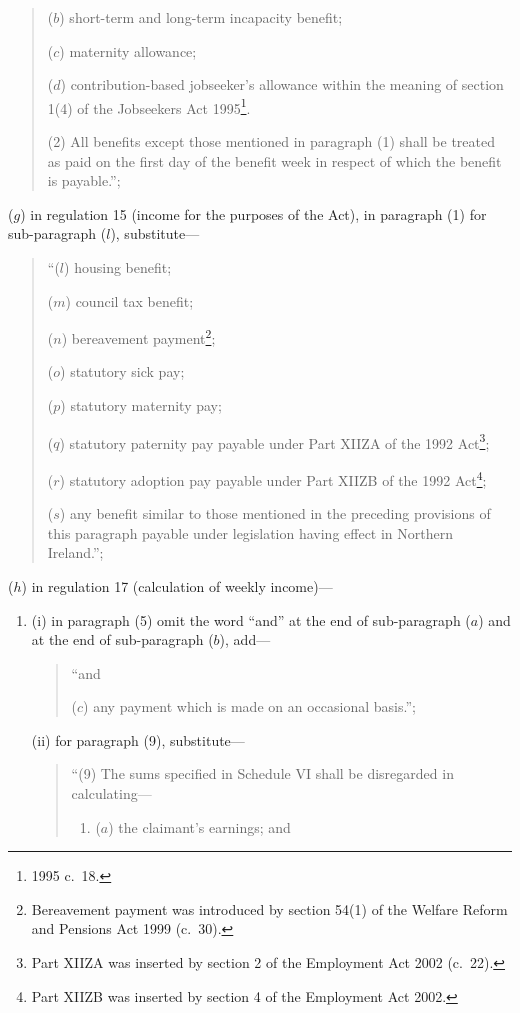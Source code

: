 \documentclass[12pt,a4paper]{article}
\begin{document}
\begin{enumerate}
\begin{quotation}
\begin{enumerate}
($b$) short-term and long-term incapacity benefit;

($c$) maternity allowance;

($d$) contribution-based jobseeker’s allowance within the meaning of section 1(4) of the Jobseekers Act 1995\footnote{1995 c.\ 18.}.
\end{enumerate}

(2) All benefits except those mentioned in paragraph (1) shall be treated as paid on the first day of the benefit week in respect of which the benefit is payable.”;
\end{quotation}

($g$) in regulation 15 (income for the purposes of the Act), in paragraph (1) for sub-paragraph ($l$), substitute—
\begin{quotation}
“($l$) housing benefit;

($m$) council tax benefit;

($n$) bereavement payment\footnote{Bereavement payment was introduced by section 54(1) of the Welfare Reform and Pensions Act 1999 (c.\ 30).};

($o$) statutory sick pay;

($p$) statutory maternity pay;

($q$) statutory paternity pay payable under Part XIIZA of the 1992 Act\footnote{Part XIIZA was inserted by section 2 of the Employment Act 2002 (c.\ 22).};

($r$) statutory adoption pay payable under Part XIIZB of the 1992 Act\footnote{Part XIIZB was inserted by section 4 of the Employment Act 2002.};

($s$) any benefit similar to those mentioned in the preceding provisions of this paragraph payable under legislation having effect in Northern Ireland.”;
\end{quotation}

($h$) in regulation 17 (calculation of weekly income)—
\begin{enumerate}\item[]
(i) in paragraph (5) omit the word “and” at the end of sub-paragraph ($a$)  and at the end of sub-paragraph ($b$), add—
\begin{quotation}
    “and

    ($c$) 
    any payment which is made on an occasional basis.”; 
\end{quotation}

(ii) for paragraph (9), substitute—
\begin{quotation}
“(9) The sums specified in Schedule VI shall be disregarded in calculating—
\begin{enumerate}\item[]
($a$) the claimant’s earnings; and


\end{enumerate}
\end{quotation}
\end{enumerate}
\end{enumerate}
\end{document}
